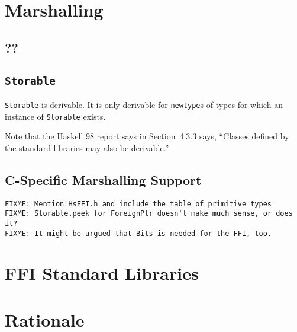 \documentclass[a4paper,twosides]{article}
\newcommand{\code}[1]{\texttt{#1}}
\begin{document}
\newpage
\section{Marshalling}
\label{sec:marshalling}

\subsection{??}

\subsection{\code{Storable}}

\code{Storable} is derivable.  It is only derivable for \code{newtype}s of
types for which an instance of \code{Storable} exists.


Note that the Haskell 98 report says in Section~4.3.3 says, ``Classes defined
by the standard libraries may also be derivable.''

\subsection{C-Specific Marshalling Support}

\begin{verbatim}
FIXME: Mention HsFFI.h and include the table of primitive types
FIXME: Storable.peek for ForeignPtr doesn't make much sense, or does it?
FIXME: It might be argued that Bits is needed for the FFI, too.
\end{verbatim}

\appendix
\newpage
\section{FFI Standard Libraries}


\section{Rationale}
\end{document}
